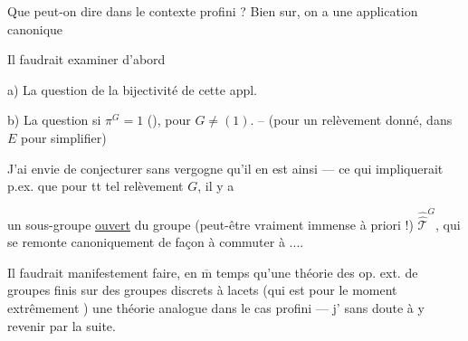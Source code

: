 Que peut-on dire dans le contexte profini ? Bien sur,
on a une application canonique

Il faudrait examiner d'abord

a) La question de la bijectivité de cette appl.

b) La question si $\pi^G=1$ (),
pour $G\ne(1)$. -- (pour un relèvement donné,
dans $E$ pour simplifier)

J'ai envie de conjecturer sans vergogne
qu'il en est ainsi --- ce qui impliquerait
p.ex. que pour tt tel relèvement $G$, il y a

un sous-groupe \uline{ouvert}  du groupe (peut-être vraiment immense à priori !) $\widehat{\widehat{\mathcal T}}^{G}$, qui se remonte canoniquement de façon à commuter à ....

Il faudrait manifestement faire, en $\overline{\mathrm m}$ temps qu'une théorie des op. ext. de groupes finis sur des groupes discrets à lacets (qui est pour le moment extrêmement ) une théorie analogue dans le cas profini --- j' sans doute à y revenir par la suite.

